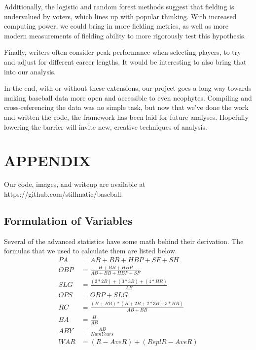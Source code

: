 \documentclass[letterpaper, 10 pt, conference]{ieeeconf}
\begin{document}
Additionally, the logistic and random forest methods suggest that fielding is undervalued by voters, which lines up with popular thinking. With increased computing power, we could bring in more fielding metrics, as well as more modern measurements of fielding ability to more rigorously test this hypothesis.

Finally, writers often consider peak performance when selecting players, to try and adjust for different career lengths. It would be interesting to also bring that into our analysis.

In the end, with or without these extensions, our project goes a long way towards making baseball data more open and accessible to even neophytes. Compiling and cross-referencing the data was no simple task, but now that we've done the work and written the code, the framework has been laid for future analyses. Hopefully lowering the barrier will invite new, creative techniques of analysis.

\addtolength{\textheight}{-12cm}   %







\section*{APPENDIX}
Our code, images, and writeup are available at https://github.com/stillmatic/baseball.
\subsection{Formulation of Variables}
Several of the advanced statistics have some math behind their derivation. The formulas that we used to calculate them are listed below.
\begin{align}
PA &= AB + BB + HBP + SF + SH\\
OBP &= \frac{H + BB + HBP}{AB + BB + HBP + SF}\\
SLG &= \frac{(2 * 2B) + (3 * 3B) + (4 * HR)}{AB}\\ 
OPS &= OBP + SLG\\
RC &= \frac{(H + BB) * (H + 2B + 2 * 3B + 3 * HR)}{AB + BB}\\
BA &= \frac{H}{AB}\\
ABY &= \frac{AB}{NumYears}\\
WAR &= (R - AveR) + (ReplR - AveR)
\end{align}
\end{document}
